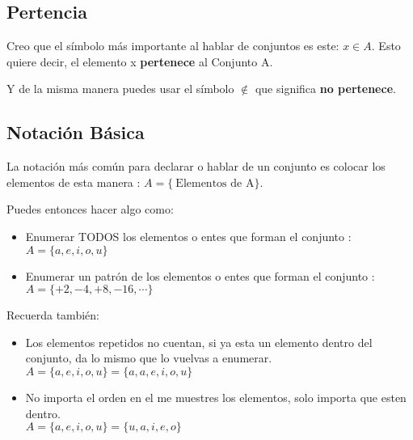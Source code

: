 \documentclass[12pt, fleqn]{report}                             %
\begin{document}
                \subsection{Pertencia}

                Creo que el símbolo más importante al hablar de conjuntos es este: $x \in A $. Esto quiere decir,
                el elemento x \textbf{pertenece} al Conjunto A.

                
                Y de la misma manera puedes usar el símbolo $\notin$ que significa \textbf{no pertenece}.


                \subsection{Notación Básica}

                    La notación más común para declarar o hablar de un conjunto es colocar los elementos de esta
                    manera : $ A = \{\ \text{Elementos de A} \}$.

                    Puedes entonces hacer algo como:

                    \begin{itemize}
                        \item Enumerar TODOS los elementos o entes que forman el conjunto :
                        \\$A = \{a, e, i, o, u\}$

                        \item Enumerar un patrón de los elementos o entes que forman el conjunto :
                        \\$A = \{+2, -4, +8, -16, \cdots \}$
                    \end{itemize}


                    Recuerda también:

                    \begin{itemize}
                        \item Los elementos repetidos no cuentan, si ya esta un elemento dentro del
                            conjunto, da lo mismo que lo vuelvas a enumerar.\\
                            $A = \{a, e, i, o, u\} = \{a, a, e, i, o, u\}$

                        \item No importa el orden en el me muestres los elementos,
                            solo importa que esten dentro.\\
                            $A = \{a, e, i, o, u\} = \{u, a, i, e, o\}$
                    \end{itemize}
\end{document}
